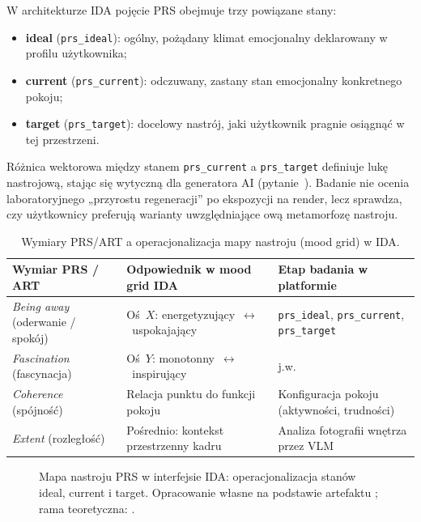 W architekturze IDA pojęcie PRS obejmuje trzy powiązane stany:
\begin{itemize}
  \item \textbf{ideal} (\texttt{prs\_ideal}): ogólny, pożądany klimat emocjonalny deklarowany w profilu użytkownika;
  \item \textbf{current} (\texttt{prs\_current}): odczuwany, zastany stan emocjonalny konkretnego pokoju;
  \item \textbf{target} (\texttt{prs\_target}): docelowy nastrój, jaki użytkownik pragnie osiągnąć w tej przestrzeni.
\end{itemize}

Różnica wektorowa między stanem \texttt{prs\_current} a \texttt{prs\_target} definiuje lukę nastrojową, stając się wytyczną dla generatora AI (pytanie~). Badanie nie ocenia laboratoryjnego „przyrostu regeneracji” po ekspozycji na render, lecz sprawdza, czy użytkownicy preferują warianty uwzględniające ową metamorfozę nastroju.

\begin{table}[htbp]
  \centering
  \caption{Wymiary PRS/ART a operacjonalizacja mapy nastroju (mood grid) w IDA.}
  \label{tab:ch02:prs-mood-grid}
  \begin{tabular}{@{}>{\raggedright\arraybackslash}p{}>{\raggedright\arraybackslash}p{}>{\raggedright\arraybackslash}p{}@{}}
    \toprule
    Wymiar PRS / ART & Odpowiednik w mood grid IDA & Etap badania w platformie \\
    \midrule
    \emph{Being away} (oderwanie / spokój)
      & Oś~$X$: energetyzujący~$\leftrightarrow$~uspokajający
      & \texttt{prs\_ideal}, \texttt{prs\_current}, \texttt{prs\_target} \\
    \emph{Fascination} (fascynacja)
      & Oś~$Y$: monotonny~$\leftrightarrow$~inspirujący
      & j.w. \\
    \emph{Coherence} (spójność)
      & Relacja punktu do funkcji pokoju
      & Konfiguracja pokoju (aktywności, trudności) \\
    \emph{Extent} (rozległość)
      & Pośrednio: kontekst przestrzenny kadru
      & Analiza fotografii wnętrza przez VLM \\
    \bottomrule
  \end{tabular}
\end{table}

\begin{figure}[htbp]
  \centering
  \caption[Mapa nastroju PRS w interfejsie IDA: operacjonalizacja stanów ideal, current i target. Opracowanie własne na podstawie artefaktu; rama teoretyczna: Hartig i in.]{Mapa nastroju PRS w interfejsie IDA: operacjonalizacja stanów ideal, current i target.
    Opracowanie własne na podstawie artefaktu \cite{idaPlatform2026}; rama teoretyczna: \textcite{hartig1997prs}.}
  \label{fig:ch02:prs-mood-grid}
\end{figure}

